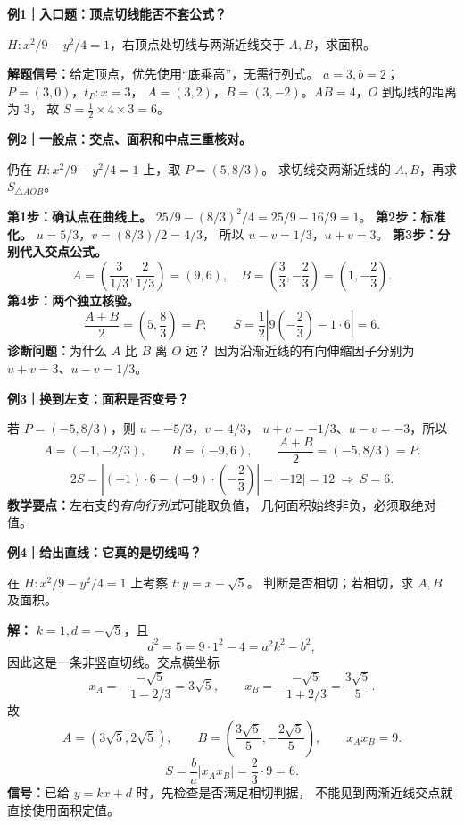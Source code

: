 \clearpage
\begin{examplebox}
\textbf{例1｜入口题：顶点切线能否不套公式？}

$H:x^2/9-y^2/4=1$，右顶点处切线与两渐近线交于 $A,B$，求面积。

\textbf{解题信号：}给定顶点，优先使用``底乘高''，无需行列式。
$a=3,b=2$；$P=(3,0)$，$t_P:x=3$，
$A=(3,2)$，$B=(3,-2)$。$AB=4$，$O$ 到切线的距离为 $3$，
故 $\boxed{S=\frac12\times4\times3=6}$。

\medskip
\textbf{例2｜一般点：交点、面积和中点三重核对。}

仍在 $H:x^2/9-y^2/4=1$ 上，取 $P=(5,8/3)$。
求切线交两渐近线的 $A,B$，再求 $S_{\triangle AOB}$。
\begin{center}

\end{center}

\textbf{第1步：确认点在曲线上。}
$25/9-(8/3)^2/4=25/9-16/9=1$。
\textbf{第2步：标准化。} $u=5/3$，$v=(8/3)/2=4/3$，
所以 $u-v=1/3$，$u+v=3$。
\textbf{第3步：分别代入交点公式。}
\[
A=\left(\frac3{1/3},\frac2{1/3}\right)=(9,6),\quad
B=\left(\frac33,-\frac23\right)=\left(1,-\frac23\right).
\]
\textbf{第4步：两个独立核验。}
\[
\frac{A+B}{2}=\left(5,\frac83\right)=P;
\qquad
S=\frac12\left|9\left(-\frac23\right)-1\cdot6\right|=\boxed6.
\]
\textbf{诊断问题：}为什么 $A$ 比 $B$ 离 $O$ 远？
因为沿渐近线的有向伸缩因子分别为 $u+v=3$、$u-v=1/3$。

\medskip
\textbf{例3｜换到左支：面积是否变号？}

若 $P=(-5,8/3)$，则 $u=-5/3$，$v=4/3$，
$u+v=-1/3$、$u-v=-3$，所以
\[
A=(-1,-2/3),\qquad B=(-9,6),\qquad
\frac{A+B}{2}=(-5,8/3)=P.
\]
\[
2S=\left|(-1)\cdot6-(-9)\cdot\left(-\frac23\right)\right|
=|-12|=12\ \Rightarrow\ \boxed{S=6}.
\]
\textbf{教学要点：}左右支的\emph{有向行列式}可能取负值，
几何面积始终非负，必须取绝对值。

\medskip
\textbf{例4｜给出直线：它真的是切线吗？}

在 $H:x^2/9-y^2/4=1$ 上考察 $t:y=x-\sqrt5$。
判断是否相切；若相切，求 $A,B$ 及面积。

\textbf{解：} $k=1,d=-\sqrt5$，且
\[
d^2=5=9\cdot1^2-4=a^2k^2-b^2,
\]
因此这是一条非竖直切线。交点横坐标
\[
x_A=-\frac{-\sqrt5}{1-2/3}=3\sqrt5,\qquad
x_B=-\frac{-\sqrt5}{1+2/3}=\frac{3\sqrt5}{5}.
\]
故
\[
A=(3\sqrt5,2\sqrt5),\qquad
B=\left(\frac{3\sqrt5}5,-\frac{2\sqrt5}5\right),
\qquad x_Ax_B=9.
\]
\[
S=\frac ba|x_Ax_B|=\frac23\cdot9=\boxed6.
\]
\textbf{信号：}已给 $y=kx+d$ 时，先检查是否满足相切判据，
不能见到两渐近线交点就直接使用面积定值。


\end{examplebox}

